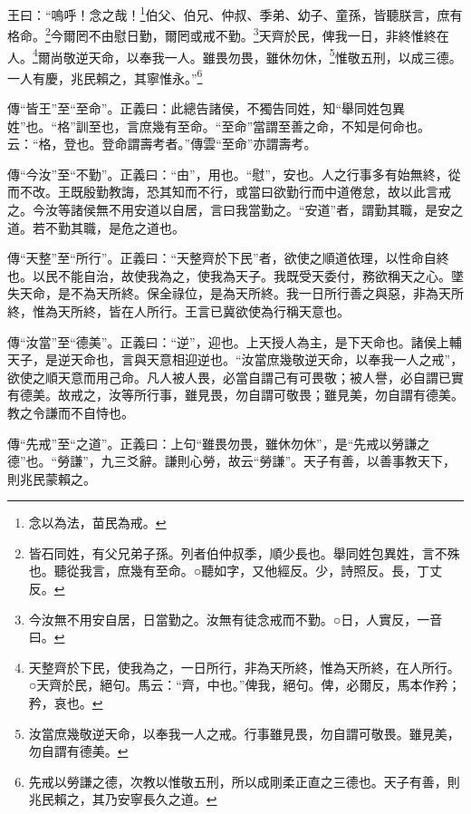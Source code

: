 王曰：“嗚呼！念之哉！\footnote{念以為法，苗民為戒。}伯父、伯兄、仲叔、季弟、幼子、童孫，皆聽朕言，庶有格命。\footnote{皆石同姓，有父兄弟子孫。列者伯仲叔季，順少長也。舉同姓包異姓，言不殊也。聽從我言，庶幾有至命。○聽如字，又他經反。少，詩照反。長，丁丈反。}今爾罔不由慰日勤，爾罔或戒不勤。\footnote{今汝無不用安自居，日當勤之。汝無有徒念戒而不勤。○日，人實反，一音曰。}天齊於民，俾我一日，非終惟終在人。\footnote{天整齊於下民，使我為之，一日所行，非為天所終，惟為天所終，在人所行。○天齊於民，絕句。馬云：“齊，中也。”俾我，絕句。俾，必爾反，馬本作矜；矜，哀也。}爾尚敬逆天命，以奉我一人。雖畏勿畏，雖休勿休，\footnote{汝當庶幾敬逆天命，以奉我一人之戒。行事雖見畏，勿自謂可敬畏。雖見美，勿自謂有德美。}惟敬五刑，以成三德。一人有慶，兆民賴之，其寧惟永。”\footnote{先戒以勞謙之德，次教以惟敬五刑，所以成剛柔正直之三德也。天子有善，則兆民賴之，其乃安寧長久之道。}


{\noindent\zhuan{}\fzbyks 傳“皆王”至“至命”。正義曰：此總告諸侯，不獨告同姓，知“舉同姓包異姓”也。“格”訓至也，言庶幾有至命。“至命”當謂至善之命，不知是何命也。云：“格，登也。登命謂壽考者。”傳雲“至命”亦謂壽考。 \par}

{\noindent\zhuan{}\fzbyks 傳“今汝”至“不勤”。正義曰：“由”，用也。“慰”，安也。人之行事多有始無終，從而不改。王既殷勤教誨，恐其知而不行，或當曰欲勤行而中道倦怠，故以此言戒之。今汝等諸侯無不用安道以自居，言曰我當勤之。“安道”者，謂勤其職，是安之道。若不勤其職，是危之道也。 \par}

{\noindent\zhuan{}\fzbyks 傳“天整”至“所行”。正義曰：“天整齊於下民”者，欲使之順道依理，以性命自終也。以民不能自治，故使我為之，使我為天子。我既受天委付，務欲稱天之心。墜失天命，是不為天所終。保全祿位，是為天所終。我一日所行善之與惡，非為天所終，惟為天所終，皆在人所行。王言已冀欲使為行稱天意也。 \par}

{\noindent\zhuan{}\fzbyks 傳“汝當”至“德美”。正義曰：“逆”，迎也。上天授人為主，是下天命也。諸侯上輔天子，是逆天命也，言與天意相迎逆也。“汝當庶幾敬逆天命，以奉我一人之戒”，欲使之順天意而用己命。凡人被人畏，必當自謂己有可畏敬；被人譽，必自謂已實有德美。故戒之，汝等所行事，雖見畏，勿自謂可敬畏；雖見美，勿自謂有德美。教之令謙而不自恃也。 \par}

{\noindent\zhuan{}\fzbyks 傳“先戒”至“之道”。正義曰：上句“雖畏勿畏，雖休勿休”，是“先戒以勞謙之德”也。“勞謙”，九三爻辭。謙則心勞，故云“勞謙”。天子有善，以善事教天下，則兆民蒙賴之。 \par}

